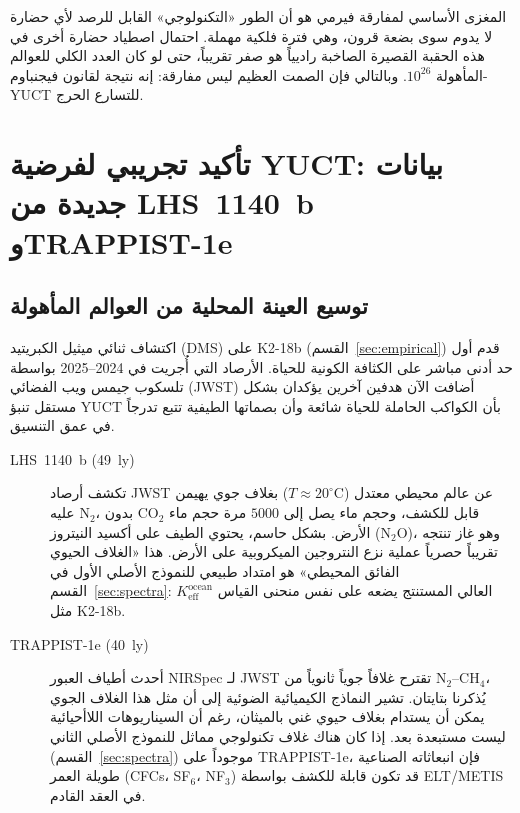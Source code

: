 \documentclass[11pt,a4paper]{article}
\begin{document}
	المغزى الأساسي لمفارقة فيرمي هو أن الطور «التكنولوجي» القابل للرصد لأي حضارة لا يدوم سوى بضعة قرون، وهي فترة فلكية مهملة. احتمال اصطياد حضارة أخرى في هذه الحقبة القصيرة الصاخبة راديياً هو صفر تقريباً، حتى لو كان العدد الكلي للعوالم المأهولة \(10^{26}\). وبالتالي فإن الصمت العظيم ليس مفارقة: إنه نتيجة لقانون فيجنباوم-YUCT للتسارع الحرج.
	
	\section{تأكيد تجريبي لفرضية YUCT: بيانات جديدة من LHS~1140~b وTRAPPIST-1e}
	\label{sec:confirmation}
	
	\subsection{توسيع العينة المحلية من العوالم المأهولة}
	اكتشاف ثنائي ميثيل الكبريتيد (DMS) على K2-18b (القسم~\ref{sec:empirical}) قدم أول حد أدنى مباشر على الكثافة الكونية للحياة. الأرصاد التي أُجريت في 2024--2025 بواسطة تلسكوب جيمس ويب الفضائي (JWST) أضافت الآن هدفين آخرين يؤكدان بشكل مستقل تنبؤ YUCT بأن الكواكب الحاملة للحياة شائعة وأن بصماتها الطيفية تتبع تدرجاً في عمق التنسيق.
	
	\begin{description}
		\item[LHS~1140~b (49~ly)] تكشف أرصاد JWST \citep{Damiano2025} عن عالم محيطي معتدل (\(T\approx 20^{\circ}\mathrm{C}\)) بغلاف جوي يهيمن عليه N$_2$، بدون CO$_2$ قابل للكشف، وحجم ماء يصل إلى \(5000\) مرة حجم ماء الأرض. بشكل حاسم، يحتوي الطيف على أكسيد النيتروز (N$_2$O)، وهو غاز تنتجه تقريباً حصرياً عملية نزع النتروجين الميكروبية على الأرض. هذا «الغلاف الحيوي الفائق المحيطي» هو امتداد طبيعي للنموذج الأصلي الأول في القسم~\ref{sec:spectra}: \(K_{\mathrm{eff}}^{\mathrm{ocean}}\) العالي المستنتج يضعه على نفس منحنى القياس مثل K2-18b.
		\item[TRAPPIST-1e (40~ly)] أحدث أطياف العبور NIRSpec لـ JWST \citep{Glidden2025} تقترح غلافاً جوياً ثانوياً من N$_2$--CH$_4$، يُذكرنا بتايتان. تشير النماذج الكيميائية الضوئية \citep{EagerNash2025} إلى أن مثل هذا الغلاف الجوي يمكن أن يستدام بغلاف حيوي غني بالميثان، رغم أن السيناريوهات اللاأحيائية ليست مستبعدة بعد. إذا كان هناك غلاف تكنولوجي مماثل للنموذج الأصلي الثاني (القسم~\ref{sec:spectra}) موجوداً على TRAPPIST-1e، فإن انبعاثاته الصناعية طويلة العمر (CFCs، SF$_6$، NF$_3$) قد تكون قابلة للكشف بواسطة ELT/METIS في العقد القادم.
	\end{description}
	
\end{document}

